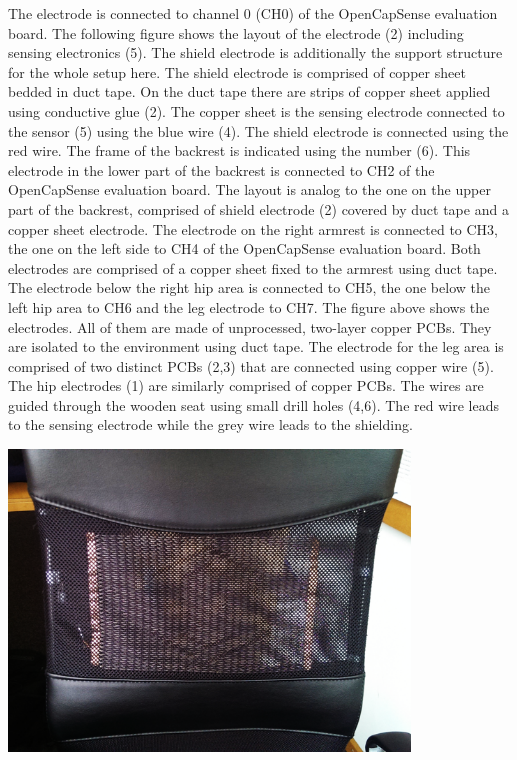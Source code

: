 The electrode is connected to channel 0 (CH0) of the OpenCapSense evaluation board. The following figure shows the layout of the electrode (2) including sensing electronics (5). The shield electrode is additionally the support structure for the whole setup here. The shield electrode is comprised of copper sheet bedded in duct tape. On the duct tape there are strips of copper sheet applied using conductive glue (2). The copper sheet is the sensing electrode connected to the sensor (5) using the blue wire (4). The shield electrode is connected using the red wire. The frame of the backrest is indicated using the number (6). 
This electrode in the lower part of the backrest is connected to CH2 of the OpenCapSense evaluation board.
The layout is analog to the one on the upper part of the backrest, comprised of shield electrode (2) covered by duct tape and a copper sheet electrode. The electrode on the right armrest is connected to CH3, the one on the left side to CH4 of the OpenCapSense evaluation board. Both electrodes are comprised of a copper sheet fixed to the armrest using duct tape. 
The electrode below the right hip area is connected to CH5, the one below the left hip area to CH6 and the leg electrode to CH7.
The figure above shows the electrodes. All of them are made of unprocessed, two-layer copper PCBs. They are isolated to the environment using duct tape. The electrode for the leg area is comprised of two distinct PCBs (2,3) that are connected using copper wire (5). The hip electrodes (1) are similarly comprised of copper PCBs. The wires are guided through the wooden seat using small drill holes (4,6). The red wire leads to the sensing electrode while the grey wire leads to the shielding.

\begin{minipage}{\linewidth}
\centering
\includegraphics[width=0.8\textwidth]{images/prot_capchair_threadelectrode}
\label{fig:prot_capchair_threadelectrode}
\end{minipage}


